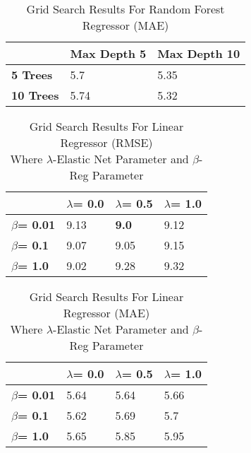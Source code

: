 \begin{table}[ht!]
\small
\centering
\caption{Grid Search Results For Random Forest Regressor (MAE)}
\label{tab:grid_search_rf_mae}
\begin{tabular}{lll} 
\toprule
  & \textbf{Max Depth 5} & \textbf{Max Depth 10} \\
\midrule
\textbf{5 Trees} & 5.7 & 5.35 \\
\textbf{10 Trees} &  5.74 & 5.32 \\
\bottomrule
\end{tabular}
\end{table}

\begin{table}[ht!]
\small
\centering
\caption{Grid Search Results For Linear Regressor (RMSE)\\ Where $\lambda$-Elastic Net Parameter and $\beta$-Reg Parameter }
\label{tab:grid_search_lr_rmse}
\begin{tabular}{llll} 
\toprule
  & \textbf{$\lambda$= 0.0} & \textbf{$\lambda$=  0.5} & \textbf{$\lambda$=  1.0} \\
\midrule
\textbf{$\beta$= 0.01} & 9.13 & \textbf{9.0} & 9.12 \\
\textbf{$\beta$= 0.1} &  9.07 & 9.05 & 9.15 \\
\textbf{$\beta$= 1.0} &  9.02 & 9.28 & 9.32 \\
\bottomrule
\end{tabular}
\end{table}

\begin{table}[ht!]
\small
\centering
\caption{Grid Search Results For Linear Regressor (MAE)\\ Where $\lambda$-Elastic Net Parameter and $\beta$-Reg Parameter}
\label{tab:grid_search_lr_mae}
\begin{tabular}{llll} 
\toprule
  & \textbf{$\lambda$= 0.0} & \textbf{$\lambda$=  0.5} & \textbf{$\lambda$=  1.0} \\
\midrule
\textbf{$\beta$= 0.01} & 5.64 & 5.64 & 5.66 \\
\textbf{$\beta$= 0.1} &  5.62 & 5.69 & 5.7 \\
\textbf{$\beta$= 1.0} &  5.65 & 5.85 & 5.95 \\
\bottomrule
\end{tabular}
\end{table}

